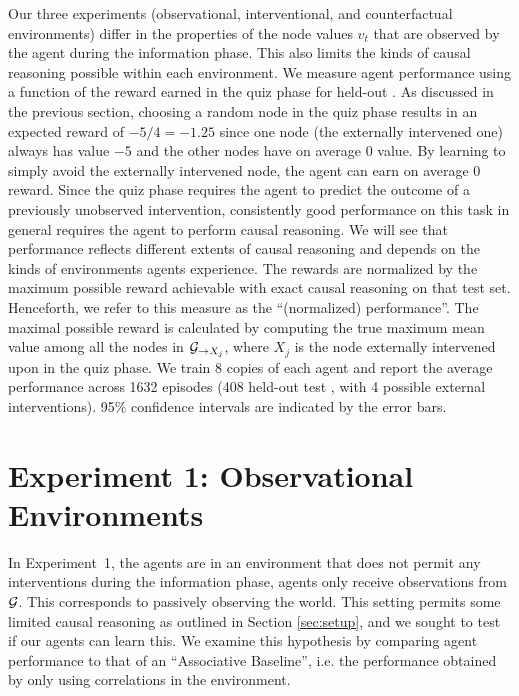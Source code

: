 Our three experiments (observational, interventional, and counterfactual environments) differ in the properties of the node values $v_t$ that are observed by the agent during the information phase. This also limits the kinds of causal reasoning possible within each environment. We measure agent performance using a function of the reward earned in the quiz phase for held-out \CBNs. 
As discussed in the previous section, choosing a random node in the quiz phase results in an expected reward of $-5 / 4 = -1.25$ since one node (the externally intervened one) always has value $-5$ and the other nodes have on average $0$ value. By learning to simply avoid the externally intervened node, the agent can earn on average $0$ reward. Since the quiz phase requires the agent to predict the outcome of a previously unobserved intervention, consistently good performance on this task in general requires the agent to perform causal reasoning. We will see that performance reflects different extents of causal reasoning and depends on the kinds of environments agents experience. The rewards are normalized by the maximum possible reward achievable with exact causal reasoning on that test set. Henceforth, we refer to this measure as the ``(normalized) performance''. The maximal possible reward is calculated by computing the true maximum mean value among all the nodes in ${\cal G}_{\rightarrow X_j}$, where $X_j$ is the node externally intervened upon in the quiz phase. %
We train 8 copies of each agent and report the average performance across 1632 episodes (408 held-out test \CBNs, with 4 possible external interventions). 95$\%$ confidence intervals are indicated by the error bars. 

\section{Experiment 1: Observational Environments}
\label{sec:expt1}

In Experiment~1, the agents are in an environment that does not permit any interventions during the information phase, agents only receive observations from ${\cal G}$.
This corresponds to passively observing the world. This setting permits some limited causal reasoning as outlined in Section \ref{sec:setup}, and we sought to test if our agents can learn this. We examine this hypothesis by comparing agent performance to that of an ``Associative Baseline'', i.e. the performance obtained by only using correlations in the environment. 

